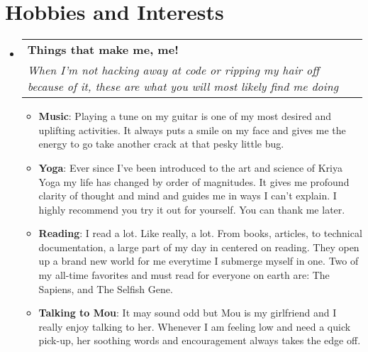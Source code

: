 \documentclass[letterpaper,11pt]{article}
\makeatletter
\newcommand{\resumeItem}[2]{
  \item\small{
    \textbf{#1}{: #2 \vspace{-2pt}}
  }
}
\newcommand{\resumeSubheading}[4]{
  \vspace{-1pt}\item
    \begin{tabular*}{0.97\textwidth}{l@{\extracolsep{\fill}}r}
      \textbf{#1} & #2 \\
      \textit{\small#3} & \textit{\small #4} \\
    \end{tabular*}\vspace{-5pt}
}
\newcommand{\resumeSubHeadingListStart}{\begin{itemize}[leftmargin=*]}
\newcommand{\resumeSubHeadingListEnd}{\end{itemize}}
\newcommand{\resumeItemListStart}{\begin{itemize}}
\newcommand{\resumeItemListEnd}{\end{itemize}\vspace{-5pt}}
\makeatother
\begin{document}
\section{Hobbies and Interests}
  \resumeSubHeadingListStart
      \resumeSubheading
      {Things that make me, me!}{}
      {When I'm not hacking away at code or ripping my hair off because of it, these are what you will most likely find me doing}{}
      \resumeItemListStart
      	\resumeItem{Music}{Playing a tune on my guitar is one of my most desired and uplifting activities. It always puts a smile on my face and gives me the energy to go take another crack at that pesky little bug.}
      	\resumeItem{Yoga}{Ever since I've been introduced to the art and science of Kriya Yoga my life has changed by order of magnitudes. It gives me profound clarity of thought and mind and guides me in ways I can't explain. I highly recommend you try it out for yourself. You can thank me later.}
      	\resumeItem{Reading}{I read a lot. Like really, a lot. From books, articles, to technical documentation, a large part of my day in centered on reading. They open up a brand new world for me everytime I submerge myself in one. Two of my all-time favorites and must read for everyone on earth are: The Sapiens, and The Selfish Gene.}      	
      	\resumeItem{Talking to Mou}{It may sound odd but Mou is my girlfriend and I really enjoy talking to her. Whenever I am feeling low and need a quick pick-up, her soothing words and encouragement always takes the edge off.}      	
      \resumeItemListEnd    
 \resumeSubHeadingListEnd
\end{document}
